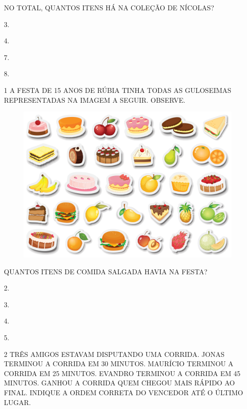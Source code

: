 NO TOTAL, QUANTOS ITENS HÁ NA COLEÇÃO DE NÍCOLAS?

\begin{escolha}[itemsep=0pt]
\item 3.

\item 4.

\item 7.

\item 8.
\end{escolha}


\pagebreak


\num{1} A FESTA DE 15 ANOS DE RÚBIA TINHA TODAS AS GULOSEIMAS REPRESENTADAS
NA IMAGEM A SEGUIR. OBSERVE.

\begin{figure}[htpb!]
\centering
\includegraphics[width=.5\textwidth]{./media/SAEB_1ANO_MAT_FIGURA136.png}
\end{figure}

QUANTOS ITENS DE COMIDA SALGADA HAVIA NA FESTA?

\begin{escolha}[itemsep=0pt]
\item 2.

\item 3.

\item 4.

\item 5.
\end{escolha}

\num{2} TRÊS AMIGOS ESTAVAM DISPUTANDO UMA CORRIDA. JONAS TERMINOU A CORRIDA EM 30
MINUTOS. MAURÍCIO TERMINOU A CORRIDA EM 25 MINUTOS. EVANDRO TERMINOU A
CORRIDA EM 45 MINUTOS. GANHOU A CORRIDA QUEM CHEGOU MAIS RÁPIDO AO FINAL. INDIQUE A
ORDEM CORRETA DO VENCEDOR ATÉ O ÚLTIMO LUGAR.

